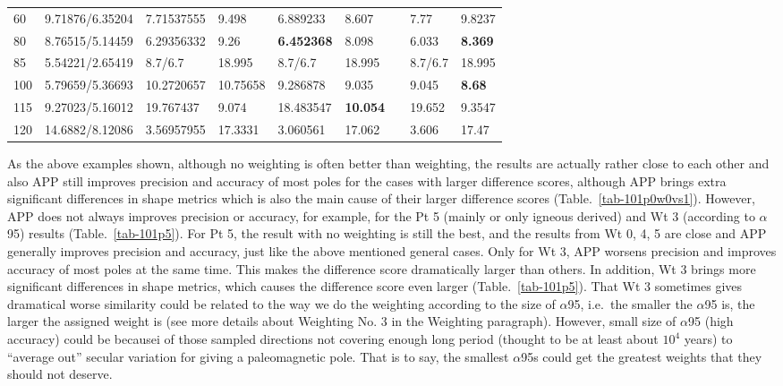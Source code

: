 \begin{table*}
\begin{tabular}{|l|l|l|l|l|l|l|l|l|l|}
60 & 9.71876/6.35204 & 7.71537555 & 9.498 & 6.889233 & 8.607 & \multicolumn{2}{l|}{} & 7.77 & 9.8237 \\ \cline{1-6} \cline{9-10} 
80 & 8.76515/5.14459 & 6.29356332 & 9.26 & \textbf{6.452368} & 8.098 & \multicolumn{2}{l|}{} & 6.033 & \textbf{8.369} \\ \cline{1-6} \cline{9-10} 
85 & 5.54221/2.65419 & 8.7/6.7 & 18.995 & 8.7/6.7 & 18.995 & \multicolumn{2}{l|}{} & 8.7/6.7 & 18.995 \\ \cline{1-6} \cline{9-10} 
100 & 5.79659/5.36693 & 10.2720657 & 10.75658 & 9.286878 & 9.035 & \multicolumn{2}{l|}{} & 9.045 & \textbf{8.68} \\ \cline{1-6} \cline{9-10} 
115 & 9.27023/5.16012 & 19.767437 & 9.074 & 18.483547 & \textbf{10.054} & \multicolumn{2}{l|}{} & 19.652 & 9.3547 \\ \cline{1-6} \cline{9-10} 
120 & 14.6882/8.12086 & 3.56957955 & 17.3331 & 3.060561 & 17.062 & \multicolumn{2}{l|}{} & 3.606 & 17.47 \\ \cline{1-6} \cline{9-10} 
\end{tabular}
\end{table*}

As the above examples shown, although no weighting is often better than
weighting, the results are actually rather close to each other and also APP
still improves precision and accuracy of most poles for the cases with larger
difference scores, although APP brings extra significant differences in shape
metrics which is also the main cause of their larger difference scores
(Table.~\ref{tab-101p0w0vs1}). However, APP does not always improves precision
or accuracy, for example, for the Pt 5 (mainly or only igneous derived) and Wt 3
(according to $\alpha$95) results (Table.~\ref{tab-101p5}). For Pt 5, the result
with no weighting is still the best, and the results from Wt 0, 4, 5
are close and APP generally improves precision and accuracy, just like the above
mentioned general cases. Only for Wt 3, APP worsens precision and improves
accuracy of most poles at the same time. This makes the difference score
dramatically larger than others. In addition, Wt 3 brings more significant
differences in shape metrics, which causes the difference score even larger
(Table.~\ref{tab-101p5}). That Wt 3 sometimes gives dramatical worse similarity
could be related to the way we do the weighting according to the size of
$\alpha$95, i.e.\, the smaller the $\alpha$95 is, the larger the assigned
weight is (see more details about Weighting No. 3 in the Weighting paragraph).
However, small size of $\alpha$95 (high accuracy) could be becausei of those
sampled directions not covering enough long period (thought to be at least about
$10^4$ years) to ``average out'' secular variation for giving a paleomagnetic
pole. That is to say, the smallest $\alpha$95s could get the greatest weights
that they should not deserve.


